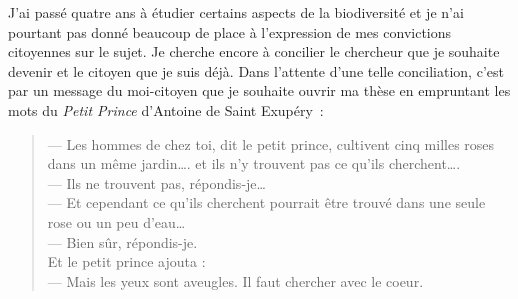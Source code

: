 J'ai passé quatre ans à étudier certains aspects de la biodiversité et
je n'ai pourtant pas donné beaucoup de place à l'expression de mes
convictions citoyennes sur le sujet. Je cherche encore à concilier le
chercheur que je souhaite devenir et le citoyen que je suis déjà. Dans
l'attente d'une telle conciliation, c'est par un message du moi-citoyen
que je souhaite ouvrir ma thèse en empruntant les mots du
\textit{Petit Prince} d'Antoine de Saint Exupéry~:

\begin{quote}
--- Les hommes de chez toi, dit le petit prince, cultivent cinq milles
roses dans un même jardin\ldots{}. et ils n'y trouvent pas ce qu'ils
cherchent\ldots{}.\\
--- Ils ne trouvent pas, répondis-je\ldots{}\\
--- Et cependant ce qu'ils cherchent pourrait être trouvé dans une seule
rose ou un peu d'eau\ldots{}\\
--- Bien sûr, répondis-je.\\
Et le petit prince ajouta :\\
--- Mais les yeux sont aveugles. Il faut chercher avec le coeur.
\end{quote}

